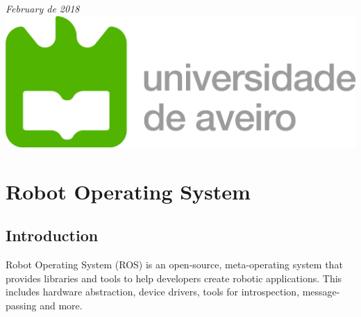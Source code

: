\documentclass[12pt]{article}
\begin{document}
\begin{titlepage}
{\large \emph{February de 2018}}\\[2cm] %


\includegraphics[scale=0.4]{ua_logo.png} %
 

\vfill %

\end{titlepage}
\tableofcontents
\newpage
\section{Robot Operating System}

\subsection{Introduction}
Robot Operating System (ROS) is an open-source, meta-operating system that provides libraries and tools to help developers create robotic applications. This includes hardware abstraction, device drivers, tools for introspection, message-passing and more.
\end{document}
